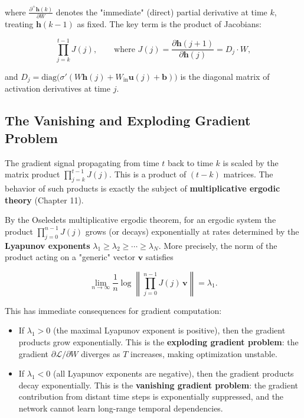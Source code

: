 where $\frac{\partial^+ \mathbf{h}(k)}{\partial W}$ denotes the "immediate" (direct) partial derivative at time $k$, treating $\mathbf{h}(k-1)$ as fixed. The key term is the product of Jacobians:

\[
\prod_{j=k}^{t-1} J(j), \qquad \text{where } J(j) = \frac{\partial \mathbf{h}(j+1)}{\partial \mathbf{h}(j)} = D_j \cdot W,
\]

and $D_j = \text{diag}\!\big(\sigma'(W\mathbf{h}(j) + W_{\text{in}}\mathbf{u}(j) + \mathbf{b})\big)$ is the diagonal matrix of activation derivatives at time $j$.

\subsection{The Vanishing and Exploding Gradient Problem}\label{sec:13.3.3}

The gradient signal propagating from time $t$ back to time $k$ is scaled by the matrix product $\prod_{j=k}^{t-1} J(j)$. This is a product of $(t-k)$ matrices. The behavior of such products is exactly the subject of \textbf{multiplicative ergodic theory} (Chapter 11).

By the Oseledets multiplicative ergodic theorem, for an ergodic system the product $\prod_{j=0}^{n-1} J(j)$ grows (or decays) exponentially at rates determined by the \textbf{Lyapunov exponents} $\lambda_1 \geq \lambda_2 \geq \cdots \geq \lambda_N$. More precisely, the norm of the product acting on a "generic" vector $\mathbf{v}$ satisfies

\[
\lim_{n \to \infty} \frac{1}{n} \log \left\|\prod_{j=0}^{n-1} J(j) \, \mathbf{v}\right\| = \lambda_1.
\]

This has immediate consequences for gradient computation:

\begin{itemize}[nosep]
  \item If $\lambda_1 > 0$ (the maximal Lyapunov exponent is positive), then the gradient products grow exponentially. This is the \textbf{exploding gradient problem}: the gradient $\partial \mathcal{L}/\partial W$ diverges as $T$ increases, making optimization unstable.

  \item If $\lambda_1 < 0$ (all Lyapunov exponents are negative), then the gradient products decay exponentially. This is the \textbf{vanishing gradient problem}: the gradient contribution from distant time steps is exponentially suppressed, and the network cannot learn long-range temporal dependencies.
\end{itemize}

